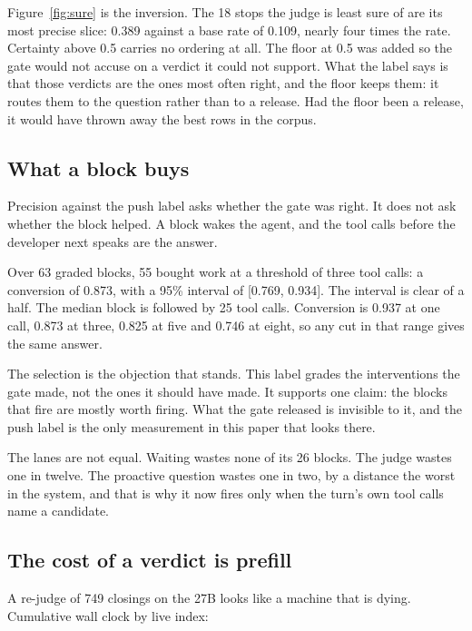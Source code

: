 Figure~\ref{fig:sure} is the inversion. The 18 stops the judge is least sure
of are its most precise slice: 0.389 against a base rate of 0.109, nearly
four times the rate. Certainty above 0.5 carries no ordering at all. The floor at 0.5 was added so the gate
would not accuse on a verdict it could not support. What the label says is
that those verdicts are the ones most often right, and the floor keeps
them: it routes them to the question rather than to a release. Had the
floor been a release, it would have thrown away the best rows in the
corpus.

\subsection{What a block buys}

Precision against the push label asks whether the gate was right. It does
not ask whether the block helped. A block wakes the agent, and the tool
calls before the developer next speaks are the answer.

Over 63 graded blocks, 55 bought work at a threshold of three tool calls:
a conversion of 0.873, with a 95\% interval of [0.769, 0.934]. The
interval is clear of a half. The median block is followed by 25 tool
calls. Conversion is 0.937 at one call, 0.873 at three, 0.825 at five and
0.746 at eight, so any cut in that range gives the same answer.

The selection is the objection that stands. This label grades the
interventions the gate made, not the ones it should have made. It
supports one claim: the blocks that fire are mostly worth firing. What
the gate released is invisible to it, and the push label is the only
measurement in this paper that looks there.

The lanes are not equal. Waiting wastes none of its 26 blocks. The judge
wastes one in twelve. The proactive question wastes one in two, by a
distance the worst in the system, and that is why it now fires only when
the turn's own tool calls name a candidate.


\subsection{The cost of a verdict is prefill}
\label{sec:prefill}

A re-judge of 749 closings on the 27B looks like a machine that is
dying. Cumulative wall clock by live index:

